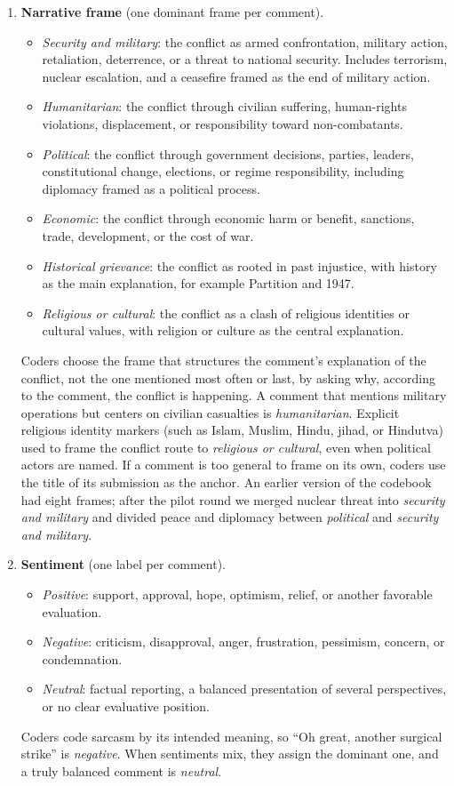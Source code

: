 \begin{enumerate}
\item \textbf{Narrative frame} (one dominant frame per comment).
\begin{itemize}
\item \textit{Security and military}: the conflict as armed confrontation, military
action, retaliation, deterrence, or a threat to national security. Includes
terrorism, nuclear escalation, and a ceasefire framed as the end of military
action.
\item \textit{Humanitarian}: the conflict through civilian suffering, human-rights
violations, displacement, or responsibility toward non-combatants.
\item \textit{Political}: the conflict through government decisions, parties,
leaders, constitutional change, elections, or regime responsibility, including
diplomacy framed as a political process.
\item \textit{Economic}: the conflict through economic harm or benefit, sanctions,
trade, development, or the cost of war.
\item \textit{Historical grievance}: the conflict as rooted in past injustice, with
history as the main explanation, for example Partition and 1947.
\item \textit{Religious or cultural}: the conflict as a clash of religious
identities or cultural values, with religion or culture as the central
explanation.
\end{itemize}
Coders choose the frame that structures the comment's explanation of the
conflict, not the one mentioned most often or last, by asking why, according to
the comment, the conflict is happening. A comment that mentions military
operations but centers on civilian casualties is \textit{humanitarian}. Explicit
religious identity markers (such as Islam, Muslim, Hindu, jihad, or Hindutva)
used to frame the conflict route to \textit{religious or cultural}, even when
political actors are named. If a comment is too general to frame on its own,
coders use the title of its submission as the anchor. An earlier version of the
codebook had eight frames; after the pilot round we merged nuclear threat into
\textit{security and military} and divided peace and diplomacy between
\textit{political} and \textit{security and military}.

\item \textbf{Sentiment} (one label per comment).
\begin{itemize}
\item \textit{Positive}: support, approval, hope, optimism, relief, or another
favorable evaluation.
\item \textit{Negative}: criticism, disapproval, anger, frustration, pessimism,
concern, or condemnation.
\item \textit{Neutral}: factual reporting, a balanced presentation of several
perspectives, or no clear evaluative position.
\end{itemize}
Coders code sarcasm by its intended meaning, so ``Oh great, another surgical
strike'' is \textit{negative}. When sentiments mix, they assign the dominant one,
and a truly balanced comment is \textit{neutral}.


\end{enumerate}
